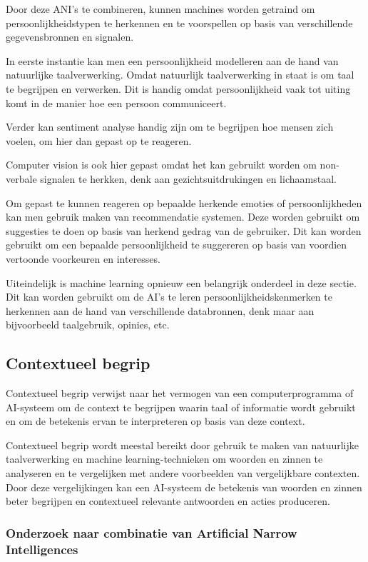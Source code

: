 Door deze ANI's te combineren, kunnen machines worden getraind om persoonlijkheidstypen te herkennen en te voorspellen op basis van verschillende gegevensbronnen en signalen.

In eerste instantie kan men een persoonlijkheid modelleren aan de hand van natuurlijke taalverwerking. Omdat natuurlijk taalverwerking in staat is om taal te begrijpen en verwerken. Dit is handig omdat persoonlijkheid vaak tot uiting komt in de manier hoe een persoon communiceert.

Verder kan sentiment analyse handig zijn om te begrijpen hoe mensen zich voelen, om hier dan gepast op te reageren.

Computer vision is ook hier gepast omdat het kan gebruikt worden om non-verbale signalen te herkken, denk aan gezichtsuitdrukingen en lichaamstaal.

Om gepast te kunnen reageren op bepaalde herkende emoties of persoonlijkheden kan men gebruik maken van recommendatie systemen. Deze worden gebruikt om suggesties te doen op basis van herkend gedrag van de gebruiker. Dit kan worden gebruikt om een bepaalde persoonlijkheid te suggereren op basis van voordien vertoonde voorkeuren en interesses.

Uiteindelijk is machine learning opnieuw een belangrijk onderdeel in deze sectie. Dit kan worden gebruikt om de AI's te leren persoonlijkheidskenmerken te herkennen aan de hand van verschillende databronnen, denk maar aan bijvoorbeeld taalgebruik, opinies, etc.

\subsection{Contextueel begrip}

Contextueel begrip verwijst naar het vermogen van een computerprogramma of AI-systeem om de context te begrijpen waarin taal of informatie wordt gebruikt en om de betekenis ervan te interpreteren op basis van deze context.

Contextueel begrip wordt meestal bereikt door gebruik te maken van natuurlijke taalverwerking en machine learning-technieken om woorden en zinnen te analyseren en te vergelijken met andere voorbeelden van vergelijkbare contexten. Door deze vergelijkingen kan een AI-systeem de betekenis van woorden en zinnen beter begrijpen en contextueel relevante antwoorden en acties produceren.

\subsubsection{Onderzoek naar combinatie van Artificial Narrow Intelligences}

